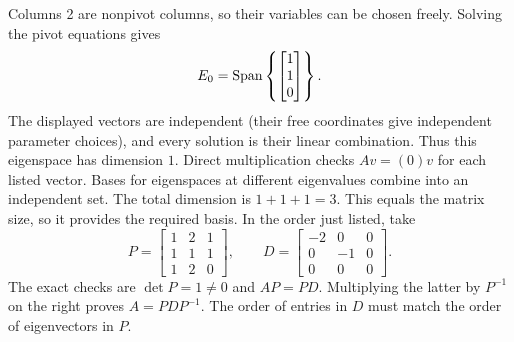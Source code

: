 Columns 2 are nonpivot columns, so their variables can be chosen freely. Solving the pivot equations gives
\[E_{0}=\operatorname{Span}\left\{\begin{bmatrix}1\\1\\0\end{bmatrix}\right\}.\]
The displayed vectors are independent (their free coordinates give independent parameter choices), and every solution is their linear combination. Thus this eigenspace has dimension $1$. Direct multiplication checks $Av=(0)v$ for each listed vector.
Bases for eigenspaces at different eigenvalues combine into an independent set. The total dimension is $1+1+1=3$.
This equals the matrix size, so it provides the required basis. In the order just listed, take
\[P=\begin{bmatrix}1&2&1\\1&1&1\\1&2&0\end{bmatrix},\qquad D=\begin{bmatrix}-2&0&0\\0&-1&0\\0&0&0\end{bmatrix}.\]
The exact checks are $\det P=1\ne0$ and $AP=PD$. Multiplying the latter by $P^{-1}$ on the right proves $A=PDP^{-1}$. The order of entries in $D$ must match the order of eigenvectors in $P$.


